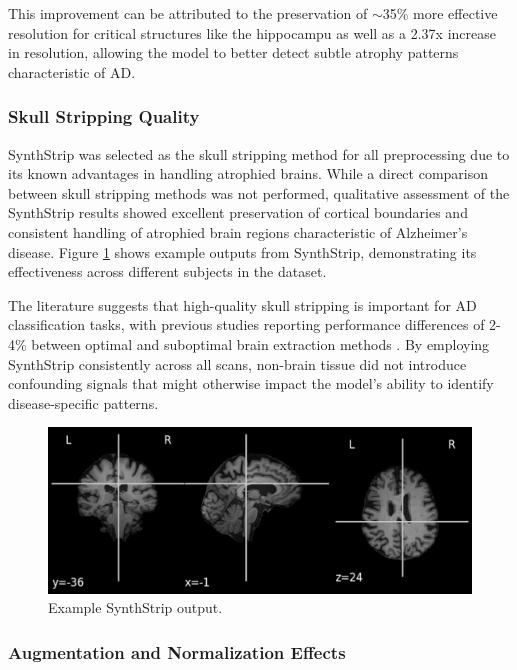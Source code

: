 \documentclass[11pt, a4paper]{article}
\begin{document}
This improvement can be attributed to the preservation of $\sim$35\% more effective resolution for critical structures like the hippocampu as well as a 2.37x increase in resolution, allowing the model to better detect subtle atrophy patterns characteristic of AD.

\subsubsection{Skull Stripping Quality}

SynthStrip was selected as the skull stripping method for all preprocessing due to its known advantages in handling atrophied brains. While a direct comparison between skull stripping methods was not performed, qualitative assessment of the SynthStrip results showed excellent preservation of cortical boundaries and consistent handling of atrophied brain regions characteristic of Alzheimer's disease. Figure \ref{fig:skull_stripping_comparison} shows example outputs from SynthStrip, demonstrating its effectiveness across different subjects in the dataset.

The literature suggests that high-quality skull stripping is important for AD classification tasks, with previous studies reporting performance differences of 2-4\% between optimal and suboptimal brain extraction methods \cite{hoopes2022synthstrip}. By employing SynthStrip consistently across all scans, non-brain tissue did not introduce confounding signals that might otherwise impact the model's ability to identify disease-specific patterns.

\begin{figure}[htbp]
  \centering
  \includegraphics[width=\textwidth]{figures/ss.png}
  \caption{Example SynthStrip output.}
  \label{fig:skull_stripping_comparison}
\end{figure}

\subsubsection{Augmentation and Normalization Effects}
\end{document}
